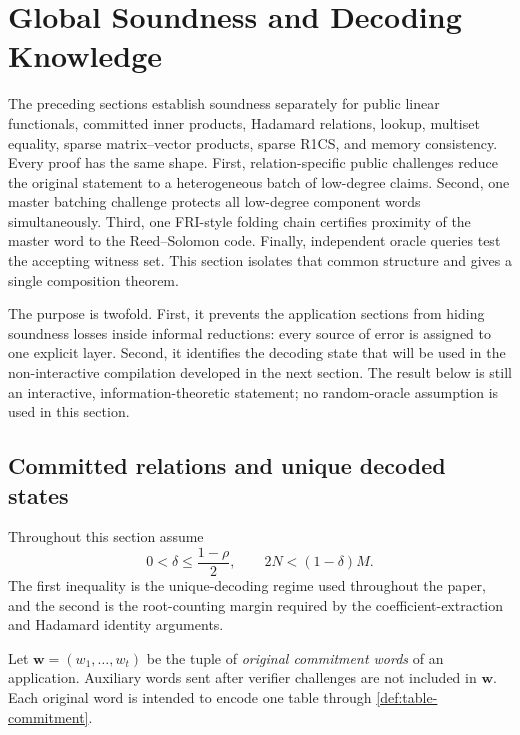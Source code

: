 \section{Global Soundness and Decoding Knowledge}
\label{sec:soundness}

The preceding sections establish soundness separately for public linear functionals, committed inner products, Hadamard relations, lookup, multiset equality, sparse matrix--vector products, sparse R1CS, and memory consistency.  Every proof has the same shape.  First, relation-specific public challenges reduce the original statement to a heterogeneous batch of low-degree claims.  Second, one master batching challenge protects all low-degree component words simultaneously.  Third, one FRI-style folding chain certifies proximity of the master word to the Reed--Solomon code.  Finally, independent oracle queries test the accepting witness set.  This section isolates that common structure and gives a single composition theorem.

The purpose is twofold.  First, it prevents the application sections from hiding soundness losses inside informal reductions: every source of error is assigned to one explicit layer.  Second, it identifies the decoding state that will be used in the non-interactive compilation developed in the next section.  The result below is still an interactive, information-theoretic statement; no random-oracle assumption is used in this section.

\subsection{Committed relations and unique decoded states}
\label{sec:global-decoded-state}

Throughout this section assume
\begin{equation}
  0<\delta\le \frac{1-\rho}{2},
  \qquad
  2N<(1-\delta)M.
  \label{eq:global-soundness-parameters}
\end{equation}
The first inequality is the unique-decoding regime used throughout the paper, and the second is the root-counting margin required by the coefficient-extraction and Hadamard identity arguments.

Let $\mathbf w=(w_1,\ldots,w_t)$ be the tuple of \emph{original commitment words} of an application.  Auxiliary words sent after verifier challenges are not included in $\mathbf w$.  Each original word is intended to encode one table through \cref{def:table-commitment}.

